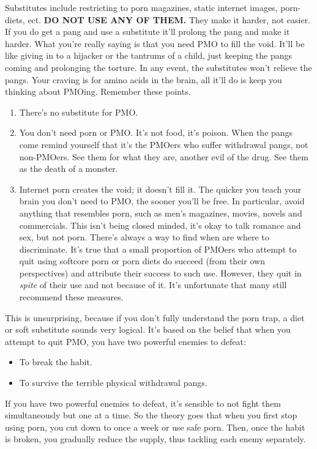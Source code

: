 \documentclass[easypeasy.tex]{subfiles}
\begin{document}
Substitutes include restricting to porn magazines, static internet images, porn-diets, ect. \textbf{DO NOT USE ANY OF THEM.} They make it harder, not easier. If you do get a pang and use a substitute it'll prolong the pang and make it harder. What you're really saying is that you need PMO to fill the void. It'll be like giving in to a hijacker or the tantrums of a child, just keeping the pangs coming and prolonging the torture. In any event, the substitutes won't relieve the pangs. Your craving is for amino acids in the brain, all it'll do is keep you thinking about PMOing. Remember these points.
\begin{enumerate}
  \item There's no substitute for PMO.
  \item You don't need porn or PMO. It's not food, it's poison. When the pangs come remind yourself that it's the PMOers who suffer withdrawal pangs, not non-PMOers. See them for what they are, another evil of the drug. See them as the death of a monster.
  \item Internet porn creates the void; it doesn't fill it. The quicker you teach your brain you don't need to PMO, the sooner you'll be free. In particular, avoid anything that resembles porn, such as men's magazines, movies, novels and commercials. This isn't being closed minded, it's okay to talk romance and sex, but not porn. There's always a way to find when are where to discriminate. It's true that a small proportion of PMOers who attempt to quit using softcore porn or porn diets do succeed (from their own perspectives) and attribute their success to such use. However, they quit in \textit{spite} of their use and not because of it. It's unfortunate that many still recommend these measures.
\end{enumerate}

This is unsurprising, because if you don't fully understand the porn trap, a diet or soft substitute sounds very logical. It's based on the belief that when you attempt to quit PMO, you have two powerful enemies to defeat:
\begin{itemize}
  \item To break the habit.
  \item To survive the terrible physical withdrawal pangs.
\end{itemize}

If you have two powerful enemies to defeat, it's sensible to not fight them simultaneously but one at a time. So the theory goes that when you first stop using porn, you cut down to once a week or use safe porn. Then, once the habit is broken, you gradually reduce the supply, thus tackling each enemy separately.
\end{document}
